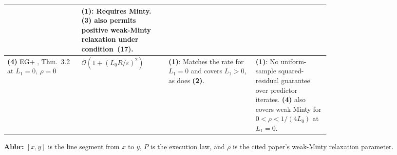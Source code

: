 \begin{table}[tp]
\begin{threeparttable}
\begin{tabularx}{\linewidth}{@{}>{\raggedright\arraybackslash}p{0.23\linewidth}>{\raggedright\arraybackslash}p{0.27\linewidth}>{\raggedright\arraybackslash}p{0.27\linewidth}>{\raggedright\arraybackslash}X@{}}
& \textbf{(1)}: Requires Minty. \textbf{(3)} also permits positive weak-Minty relaxation under condition~(17). \\
\midrule
\textbf{(4)} EG+ \citep{ewmDDJ2021Verified}, Thm.~3.2 at \(L_1=0,\ \rho=0\)
& \(\mathcal{O}(1+(L_0R/\varepsilon)^2)\)
& \textbf{(1)}: Matches the rate for \(L_1=0\) and covers \(L_1>0\), as does \textbf{(2)}.
& \textbf{(1)}: No uniform-sample squared-residual guarantee over predictor iterates. \textbf{(4)} also covers weak Minty for \(0<\rho<1/(4L_0)\) at \(L_1=0\). \\
\bottomrule
\end{tabularx}
\begin{tablenotes}[flushleft]\footnotesize
\item[] \textbf{Abbr:} \([x,y]\) is the line segment from \(x\) to \(y\), \(P\) is the execution law, and \(\rho\) is the cited paper's weak-Minty relaxation parameter.
\end{tablenotes}
\end{threeparttable}
\end{table}
